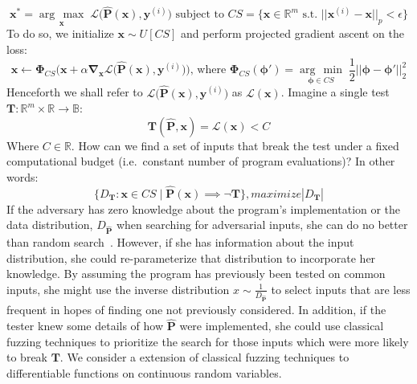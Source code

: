 \documentclass[12pt,initial,twoside,maitrise]{dms}
\newcommand{\argmax}[1]{\underset{#1}{\operatorname{arg}\,\operatorname{max}}\;}
\newcommand{\argmin}[1]{\underset{#1}{\operatorname{arg}\,\operatorname{min}}\;}
\numberwithin{equation}{section}
\numberwithin{table}{chapter}
\numberwithin{figure}{chapter}
\begin{document}
%
\begin{equation}
\mathbf{x}^* = \argmax{\mathbf{x}}\mathcal{L}\big(\mathbf{\hat P}(\mathbf{x}), \mathbf{y}^{(i)}\big) \text{ subject to } CS = \{\mathbf{x} \in \mathbb{R}^m \text{ s.t. } ||\mathbf{x}^{(i)} - \mathbf{x}||_p    < \epsilon\}
\end{equation}
%
 To do so, we initialize $\mathbf{x} \sim U[CS]$ and perform projected gradient ascent on the loss:
%
\begin{equation}\label{eq:projected_gd}
    \mathbf x \leftarrow \mathbf{\Phi}_{CS}\Big(\mathbf x + \alpha\mathbf\nabla_{\mathbf x} \mathcal{L}\big(\mathbf{\hat P}(\mathbf{x}), \mathbf{y}^{(i)}\big)\Big) \text{, where }
	\mathbf{\Phi}_{CS}(\mathbf \phi') = \argmin{\mathbf \phi \in CS}\frac{1}{2}||\mathbf \phi - \mathbf \phi'||^2_2
\end{equation}
%
Henceforth we shall refer to $\mathcal{L}\big(\mathbf{\hat P}(\mathbf{x}), \mathbf{y}^{(i)}\big)$ as $\mathcal{L}(\mathbf x)$. Imagine a single test $\mathbf{T}: \mathbb{R}^m \times \mathbb{R} \rightarrow \mathbb{B}$:
%
\begin{equation} \label{eq:output_constraint_example}
    \mathbf T(\mathbf{\hat P}, \mathbf{x}) = \mathcal{L}(\mathbf{x}) < C
\end{equation}
%
Where $C \in \mathbb{R}$. How can we find a set of inputs that break the test under a fixed computational budget (i.e.\ constant number of program evaluations)? In other words:
%
\begin{equation}
\{ D_\mathbf T: \mathbf x \in CS \mid \mathbf{\hat P}(\mathbf x) \implies \neg \mathbf T \}, maximize |D_\mathbf T|
\end{equation}
%
If the adversary has zero knowledge about the program's implementation or the data distribution, $D_{\mathbf{\hat P}}$ when searching for adversarial inputs, she can do no better than random search~\citep{wolpert1997no}. However, if she has information about the input distribution, she could re-parameterize that distribution to incorporate her knowledge. By assuming the program has previously been tested on common inputs, she might use the inverse distribution $x \sim \frac{1}{D_{\mathbf{\hat P}}}$ to select inputs that are less frequent in hopes of finding one not previously considered. In addition, if the tester knew some details of how $\mathbf{\hat P}$ were implemented, she could use classical fuzzing techniques to prioritize the search for those inputs which were more likely to break $\mathbf T$. We consider a extension of classical fuzzing techniques to differentiable functions on continuous random variables.
\end{document}
